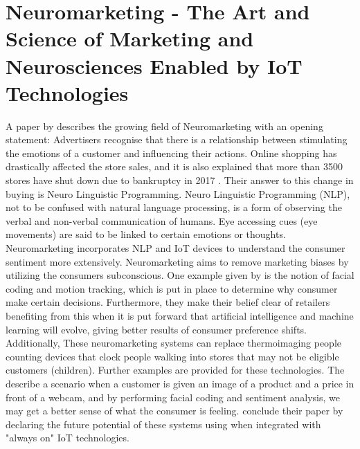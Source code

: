 \section{Neuromarketing - The Art and Science of Marketing and Neurosciences Enabled by IoT Technologies}
A paper by \citeauthor{arthmann} describes the growing field of Neuromarketing with an opening statement: Advertisers recognise that there is a relationship between stimulating the emotions of a customer and influencing their actions. Online shopping has drastically affected the store sales, and it is also explained that more than 3500 stores have shut down due to bankruptcy in 2017 \citep{arthmann}. Their answer to this change in buying is Neuro Linguistic Programming. Neuro Linguistic Programming (NLP), not to be confused with natural language processing, is a form of observing the verbal and non-verbal communication of humans. Eye accessing cues (eye movements) are said to be linked to certain emotions or thoughts. Neuromarketing incorporates NLP and IoT devices to understand the consumer sentiment more extensively. Neuromarketing aims to remove marketing biases by utilizing the consumers subconscious. One example given by \citeauthor{arthmann} is the notion of facial coding and motion tracking, which is put in place to determine why consumer make certain decisions. 
Furthermore, they make their belief clear of retailers benefiting from this when it is put forward that artificial intelligence and machine learning will evolve, giving better results of consumer preference shifts. Additionally, These neuromarketing systems can replace thermoimaging people counting devices that clock people walking into stores that may not be eligible customers (children). Further examples are provided for these technologies. The describe a scenario when a customer is given an image of a product and a price in front of a webcam, and by performing facial coding and sentiment analysis, we may get a better sense of what the consumer is feeling.
\citeauthor{arthmann} conclude their paper by declaring the future potential of these systems using when integrated with "always on" IoT technologies. 

